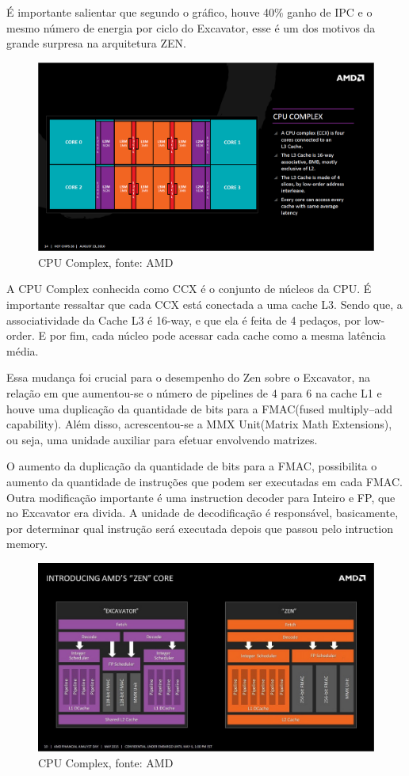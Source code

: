 \documentclass[12pt]{article}
\begin{document}
É importante salientar que segundo o gráfico, houve 40\% ganho de IPC e o mesmo número de energia por ciclo do Excavator, esse é um dos motivos da grande surpresa na arquitetura ZEN.


\begin{figure}[ht]
\centering
\includegraphics[width=120mm,scale=0.8]{AMD-Zen_CPU-Complex.png}
\caption{CPU Complex, fonte: AMD}
\label{fig:AMD CORE}
\end{figure}

A CPU Complex conhecida como CCX é o conjunto de núcleos da CPU. É importante ressaltar que cada CCX está conectada a uma cache L3. Sendo que, a associatividade da Cache L3 é 16-way, e que ela é feita de 4 pedaços, por low-order. E por fim, cada núcleo pode acessar cada cache como a mesma latência média.

Essa mudança foi crucial para o desempenho do Zen sobre o Excavator, na relação em que aumentou-se o número de pipelines de 4 para 6 na cache L1 e houve uma duplicação da quantidade de bits para a FMAC(fused multiply–add capability). Além disso, acrescentou-se a MMX Unit(Matrix Math Extensions), ou seja, uma unidade auxiliar para efetuar envolvendo matrizes. 

O aumento da duplicação da quantidade de bits para a FMAC, possibilita o aumento da quantidade de instruções que podem ser executadas em cada FMAC. Outra modificação importante é uma instruction decoder para Inteiro e FP, que no Excavator era divida. A unidade de decodificação é responsável, basicamente, por determinar qual instrução será executada depois que passou pelo intruction memory.


\begin{figure}[ht]
\centering
\includegraphics[width=115mm,scale=0.8]{zenex.jpg}
\caption{CPU Complex, fonte: AMD}
\label{fig:AMD CORE}
\end{figure}
\end{document}
